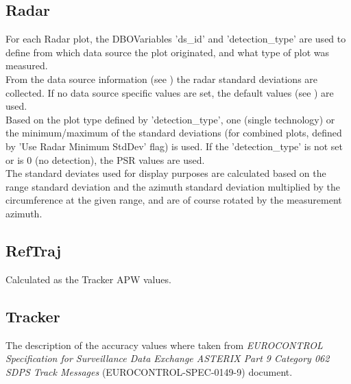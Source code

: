 \subsection{Radar}

For each Radar plot, the DBOVariables 'ds\_id' and 'detection\_type' are used to define from which data source the plot originated, and what type of plot was measured. \\

From the data source information (see ) the radar standard deviations are collected. If no data source specific values are set, the default values (see ) are used. \\

Based on the plot type defined by 'detection\_type', one (single technology) or the minimum/maximum of the standard deviations (for combined plots, defined by 'Use Radar Minimum StdDev' flag) is used. If the 'detection\_type' is not set or is 0 (no detection), the PSR values are used. \\ 

The standard deviates used for display purposes are calculated based on the range standard deviation and the azimuth standard deviation multiplied by the circumference at the given range, and are of course rotated by the measurement azimuth.

\subsection{RefTraj}

Calculated as the Tracker APW values.

\subsection{Tracker}

The description of the accuracy values where taken from \textit{EUROCONTROL Specification for Surveillance Data Exchange ASTERIX Part 9 Category 062 SDPS Track Messages} (EUROCONTROL-SPEC-0149-9) document.

